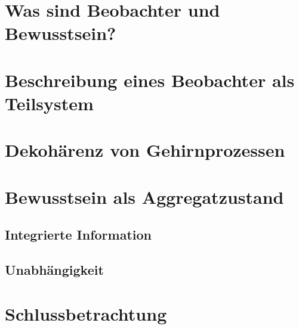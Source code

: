 
\newcommand{\Quote}[1]{\enquote{\emph{#1}}}

	
	\section{Was sind Beobachter und Bewusstsein?}
	
	\section{Beschreibung eines Beobachter als Teilsystem}
	
	\section{Dekohärenz von Gehirnprozessen}
	
	\section{Bewusstsein als Aggregatzustand}
	
		\subsection{Integrierte Information}
		
		\subsection{Unabhängigkeit}
		
	\section{Schlussbetrachtung}
	
	\newpage
	\nocite{Zeh_00}
	\printbibliography

